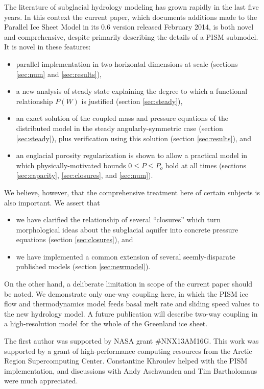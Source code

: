 \documentclass[gmd]{copernicus}   %
\begin{document}
\conclusions  \label{sec:conclusion}  The literature of subglacial hydrology modeling has grown rapidly in the last five years.  In this context the current paper, which documents additions made to the Parallel Ice Sheet Model in its 0.6 version released February 2014, is both novel and comprehensive, despite primarily describing the details of a PISM submodel.  It is novel in these features:\begin{itemize}
\item parallel implementation in two horizontal dimensions at scale (sections \ref{sec:num} and \ref{sec:results}),
\item a new analysis of steady state explaining the degree to which a functional relationship $P(W)$ is justified (section \ref{sec:steady}),
\item an exact solution of the coupled mass and pressure equations of the distributed model in the steady angularly-symmetric case (section \ref{sec:steady}), plus verification using this solution (section \ref{sec:results}), and
\item an englacial porosity regularization is shown to allow a practical model in which physically-motivated bounds $0\le P \le P_o$ hold at all times (sections \ref{sec:capacity}, \ref{sec:closures}, and \ref{sec:num}).
\end{itemize}
We believe, however, that the comprehensive treatment here of certain subjects is also important.  We assert that
\begin{itemize}
\item we have clarified the relationship of several ``closures'' which turn morphological ideas about the subglacial aquifer into concrete pressure equations (section \ref{sec:closures}), and
\item we have implemented a common extension of several seemly-disparate published models (section \ref{sec:newmodel}).
\end{itemize}
On the other hand, a deliberate limitation in scope of the current paper should be noted.  We demonstrate only one-way coupling here, in which the PISM ice flow and thermodynamics model feeds basal melt rate and sliding speed values to the new hydrology model.  A future publication will describe two-way coupling in a high-resolution model for the whole of the Greenland ice sheet.

\begin{acknowledgements}
The first author was supported by NASA grant \#NNX13AM16G.  This work was supported by a grant of high-performance computing resources from the Arctic Region Supercomputing Center.  Constantine Khroulev helped with the PISM implementation, and discussions with Andy Aschwanden and Tim Bartholomaus were much appreciated.
\end{acknowledgements}



\end{document}
